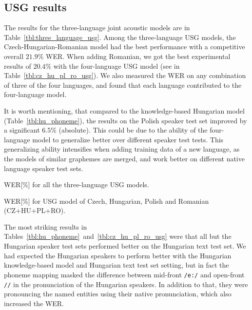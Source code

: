 \documentclass[runningheads,a4paper]{llncs}
\begin{document}
\subsection{USG results}
The results for the three-language joint acoustic models are in Table~\ref{tbl:three_language_usg}.
Among the three-language USG models, the Czech-Hungarian-Romanian model had the best performance with a competitive overall $21.9\%$ WER. 
When adding Romanian, we got the best experimental results of $20.4\%$ with the four-language USG model (see in Table~\ref{tbl:cz_hu_pl_ro_usg}).
We also measured the WER on any combination of three of the four languages, and found that each language contributed to the four-language model.

It is worth mentioning, that compared to the knowledge-based Hungarian model (Table~\ref{tbl:hu_phoneme}), the results on the Polish speaker test set improved by a significant $6.5\%$ (absolute).
This could be due to the ability of the four-language model to generalize better over different speaker test tests.
This generalizing ability intensifies when adding training data of a new language, as the models of similar graphemes are merged, and work better on different native language speaker test sets.

\begin{table}
\parbox{.45\linewidth}{
\centering
\caption{WER[\%] for all the three-language USG models.}
\label{tbl:three_language_usg}
}
\hfill
\parbox{.45\linewidth}{
\centering
\caption{WER[\%] for USG model of Czech, Hungarian, Polish and Romanian (CZ+HU+PL+RO).}
\label{tbl:cz_hu_pl_ro_usg}
}
\end{table}
The most striking results in Tables~\ref{tbl:hu_phoneme}~and~\ref{tbl:cz_hu_pl_ro_usg} were that all but the Hungarian speaker test sets performed better on the Hungarian text test set.
We had expected the Hungarian speakers to perform better with the Hungarian knowledge-based model and Hungarian text test set setting, but in fact the phoneme mapping masked the difference between mid-front \texttt{/e:/} and open-front \texttt{//} in the pronunciation of the Hungarian speakers.
In addition to that, they were pronouncing the named entities using their native pronunciation, which also increased the WER.
\end{document}
